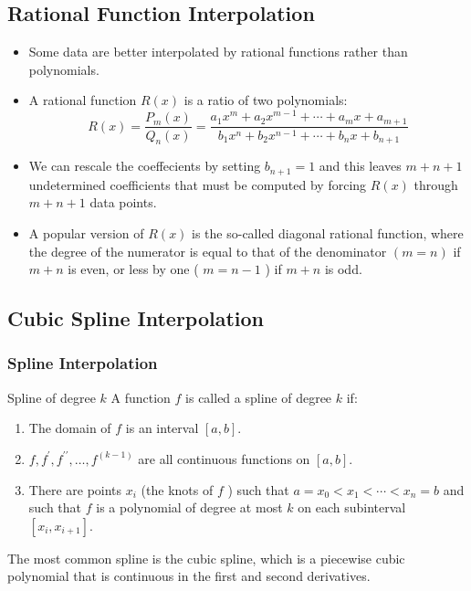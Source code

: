 \documentclass{beamer}
\begin{document}
\subsection[Rational Function Interpolation]{Rational Function Interpolation}
\begin{frame}
\begin{itemize}
  \item   Some data are better interpolated by rational functions rather than polynomials.
  \item  A rational function $R(x)$ is a ratio of two polynomials:
  \[
    R(x) = \frac{P_m(x)}{Q_n(x)}=\frac{a_1 x^m+a_2 x^{m-1}+
    \cdots+a_m x+a_{m+1}}{b_1 x^n+b_2 x^{n-1}+\cdots+b_n x+b_{n+1}}
  \]
  \item We can rescale the coeffecients by setting  $b_{n+1}=1$ and this leaves $m+n+1$ undetermined 
  coefficients that must be computed by forcing $R(x)$ through $m+n+1$ data points.
  \item A popular version of $R(x)$ is the so-called diagonal rational function, where the degree of 
  the numerator is equal to that of the denominator $(m=n)$ if $m+n$ is even, or less by one ( $m=n-1$ ) if $m+n$ is odd. 
\end{itemize}
\end{frame}
\subsection[Cubic Spline Interpolation]{Cubic Spline Interpolation}
\begin{frame}
  \frametitle{Spline Interpolation}
  \begin{block}{Spline of degree $k$}
    A function $f$ is called a spline of degree $k$ if:
    \begin{enumerate}
    \item The domain of $f$ is an interval $[a, b]$.
    \item $f, f^{\prime}, f^{\prime \prime}, \ldots, f^{(k-1)}$ are all continuous functions on $[a, b]$.
    \item There are points $x_i$ (the knots of $f$ ) such that $a=x_0<x_1<\cdots<x_n=b$ and such that $f$ is a polynomial of degree at most $k$ on each subinterval $\left[x_i, x_{i+1}\right]$.
  \end{enumerate}
  \end{block}
  The most common spline is the \alert{cubic spline}, which is a piecewise cubic polynomial that is continuous in the first and second derivatives.
\end{frame}
\end{document}
